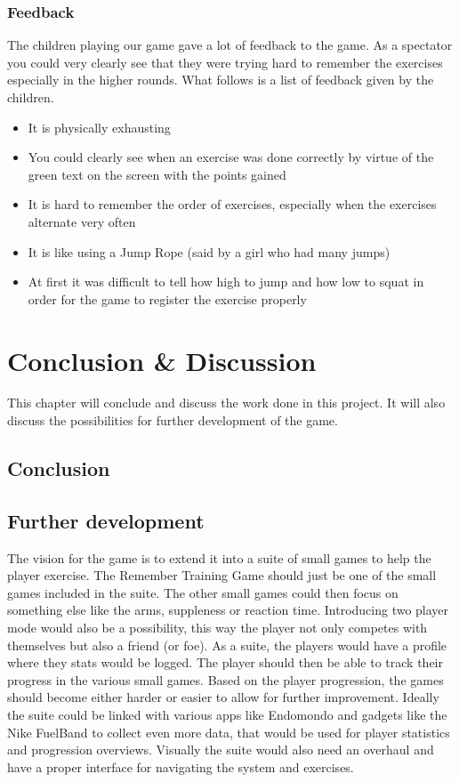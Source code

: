 \documentclass[11pt]{report}
\begin{document}
\subsection{Feedback}
The children playing our game gave a lot of feedback to the game. As a spectator you could very clearly see that they were trying hard to remember the exercises especially in the higher rounds. What follows is a list of feedback given by the children.
\begin{itemize}
\item It is physically exhausting
\item You could clearly see when an exercise was done correctly by virtue of the green text on the screen with the points gained
\item It is hard to remember the order of exercises, especially when the exercises alternate very often
\item It is like using a Jump Rope (said by a girl who had many jumps)
\item At first it was difficult to tell how high to jump and how low to squat in order for the game to register the exercise properly
\end{itemize}

\chapter{Conclusion \& Discussion}
This chapter will conclude and discuss the work done in this project. It will also discuss the possibilities for further development of the game.

\section{Conclusion}


\section{Further development}
The vision for the game is to extend it into a suite of small games to help the player exercise. The Remember Training Game should just be one of the small games included in the suite. The other small games could then focus on something else like the arms, suppleness or reaction time. Introducing two player mode would also be a possibility, this way the player not only competes with themselves but also a friend (or foe). As a suite, the players would have a profile where they stats would be logged. The player should then be able to track their progress in the various small games. Based on the player progression, the games should become either harder or easier to allow for further improvement. Ideally the suite could be linked with various apps like Endomondo and gadgets like the Nike FuelBand to collect even more data, that would be used for player statistics and progression overviews. Visually the suite would also need an overhaul and have a proper interface for navigating the system and exercises.
\end{document}
